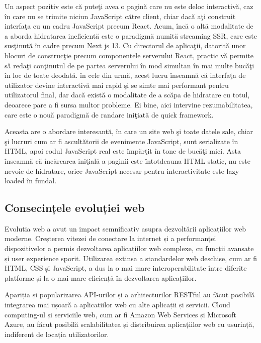 \documentclass[12pt, a4paper]{report}
\begin{document}
Un aspect pozitiv este c\u a pute\c ti avea o pagin\u a care nu este deloc interactiv\u a, caz \^ in care nu se trimite niciun JavaScript c\u atre client, chiar dac\u a a\c ti construit interfa\c ta cu un cadru JavaScript precum React. Acum, \^ inc\u a o alt\u a modalitate de a aborda hidratarea ineficient\u a este o paradigm\u a numit\u a streaming SSR, care este sus\c tinut\u a \^ in cadre precum Next js 13. Cu directorul de aplica\c tii, datorit\u a unor blocuri de construc\c tie precum componentele serverului React, practic v\u a permite s\u a reda\c ti con\c tinutul de pe partea serverului \^ in mod simultan \^ in mai multe buc\u a\c ti \^ in loc de toate deodat\u a. \^ in cele din urm\u a, acest lucru \^ inseamn\u a c\u a interfa\c ta de utilizator devine interactiv\u a mai rapid \c si se simte mai performant pentru utilizatorul final, dar dac\u a exist\u a o modalitate de a sc\u apa de hidratare cu totul, deoarece pare a fi sursa multor probleme. Ei bine, aici intervine rezumabilitatea, care este o nou\u a paradigm\u a de randare ini\c tiat\u a de quick framework.

Aceasta are o abordare interesant\u a, \^ in care un site web \c si toate datele sale, chiar \c si lucruri cum ar fi ascult\u atorii de evenimente JavaScript, sunt serializate \^ in HTML, apoi codul JavaScript real este \^ imp\u ar\c tit \^ in tone de buc\u a\c ti mici. Asta \^ inseamn\u a c\u a \^ inc\u arcarea ini\c tial\u a a paginii este \^ intotdeauna HTML static, nu este nevoie de hidratare, orice JavaScript necesar pentru interactivitate este lazy loaded \^ in fundal.



\subsection{Consecințele evoluției web}
Evolutia web a avut un impact semnificativ asupra dezvoltării aplicațiilor web moderne. Creșterea vitezei de conectare la internet și a performanței dispozitivelor a permis dezvoltarea aplicațiilor web complexe, cu funcții avansate și user experience sporit. Utilizarea extinsa a standardelor web deschise, cum ar fi HTML, CSS și JavaScript, a dus la o mai mare interoperabilitate între diferite platforme și la o mai mare eficiență în dezvoltarea aplicațiilor.

Apariția și popularizarea API-urilor și a arhitecturilor RESTful au făcut posibilă integrarea mai ușoară a aplicatiilor web cu alte aplicații și servicii. Cloud computing-ul și serviciile web, cum ar fi Amazon Web Services și Microsoft Azure, au făcut posibilă scalabilitatea și distribuirea aplicațiilor web cu usurință, indiferent de locația utilizatorilor.
\end{document}
